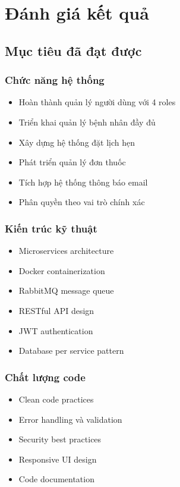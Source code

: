 \documentclass[12pt,a4paper]{report}
\begin{document}
    \chapter{Đánh giá kết quả}

    \section{Mục tiêu đã đạt được}

    \subsection{Chức năng hệ thống}
    \begin{itemize}
        \item Hoàn thành quản lý người dùng với 4 roles
        \item Triển khai quản lý bệnh nhân đầy đủ
        \item Xây dựng hệ thống đặt lịch hẹn
        \item Phát triển quản lý đơn thuốc
        \item Tích hợp hệ thống thông báo email
        \item Phân quyền theo vai trò chính xác
    \end{itemize}

    \subsection{Kiến trúc kỹ thuật}
    \begin{itemize}
        \item Microservices architecture
        \item Docker containerization
        \item RabbitMQ message queue
        \item RESTful API design
        \item JWT authentication
        \item Database per service pattern
    \end{itemize}

    \subsection{Chất lượng code}
    \begin{itemize}
        \item Clean code practices
        \item Error handling và validation
        \item Security best practices
        \item Responsive UI design
        \item Code documentation
    \end{itemize}
\end{document}
